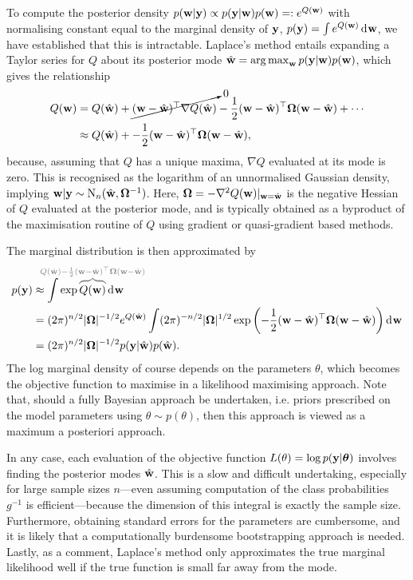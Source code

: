 To compute the posterior density $p({\mathbf w}|{\mathbf y}) \propto p({\mathbf y}|{\mathbf w})p({\mathbf w}) =: e^{Q({\mathbf w})}$ with normalising constant equal to the marginal density of ${\mathbf y}$, $p({\mathbf y}) = \int e^{Q({\mathbf w})} \operatorname{d}\hspace{0.5pt}\! {\mathbf w}$, we have established that this is intractable.
Laplace's method \citep[§4.1.1, pp. 777--778]{kass1995bayes} entails expanding a Taylor series for $Q$ about its posterior mode $\hat{{\mathbf w}} = \operatorname*{arg\,max}_{\mathbf w} p({\mathbf y}|{\mathbf w})p({\mathbf w})$, which gives the relationship
\begin{align*}
  Q({\mathbf w}) 
  &= Q(\hat{{\mathbf w}}) + 
  \cancelto{0}{({\mathbf w} - \hat{{\mathbf w}})^\top \nabla Q(\hat{{\mathbf w}})} 
  - \frac{1}{2} ({\mathbf w} - \hat{{\mathbf w}})^\top {\bm\Omega} ({\mathbf w} - \hat{{\mathbf w}}) + \cdots \\
  &\approx Q(\hat{{\mathbf w}}) + 
  - \frac{1}{2} ({\mathbf w} - \hat{{\mathbf w}})^\top {\bm\Omega} ({\mathbf w} - \hat{{\mathbf w}}),
\end{align*}
because, assuming that $Q$ has a unique maxima, $\nabla Q$ evaluated at its mode is zero.
This is recognised as the logarithm of an unnormalised Gaussian density, implying ${\mathbf w}|{\mathbf y} \sim \operatorname{N}_n(\hat{{\mathbf w}},{\bm\Omega}^{-1})$.
Here, ${\bm\Omega} = -\nabla^2 Q({\mathbf w})|_{{\mathbf w}=\hat{{\mathbf w}}}$ is the negative Hessian of $Q$ evaluated at the posterior mode, and is typically obtained as a byproduct of the maximisation routine of $Q$ using gradient or quasi-gradient based methods.

The marginal distribution is then approximated by
\begin{align*}
  p(\by) 
  &\approx \int \exp
  \greyoverbrace{Q(\bw)}{\hidewidth Q(\hat\bw) - \half (\bw - \hat\bw)^\top \bOmega (\bw - \hat\bw)\hidewidth}
   \dint \bw \\
  &= (2\pi)^{n/2} \abs{\bOmega}^{-1/2} e^{Q(\hat\bw)} 
  \int (2\pi)^{-n/2} \abs{\bOmega}^{1/2} \exp \left(- \half (\bw - \hat\bw)^\top \bOmega (\bw - \hat\bw) \right) \dint\bw \\
  &= (2\pi)^{n/2} \abs{\bOmega}^{-1/2} p(\by|\hat\bw)p(\hat\bw).
\end{align*} 
The log marginal density of course depends on the parameters $\theta$, which becomes the objective function to maximise in a likelihood maximising approach.
Note that, should a fully Bayesian approach be undertaken, i.e. priors prescribed on the model parameters using $\theta \sim p(\theta)$, then this approach is viewed as a maximum a posteriori approach.

In any case, each evaluation of the objective function $L(\theta) = \log p({\mathbf y}|{\bm\theta})$ involves finding the posterior modes $\hat{{\mathbf w}}$.
This is a slow and difficult undertaking, especially for large sample sizes $n$---even assuming computation of the class probabilities $g^{-1}$ is efficient---because the dimension of this integral is exactly the sample size.
Furthermore, obtaining standard errors for the parameters are cumbersome, and it is likely that a computationally burdensome bootstrapping approach is needed.
Lastly, as a comment, Laplace's method only approximates the true marginal likelihood well if the true function is small far away from the mode.


